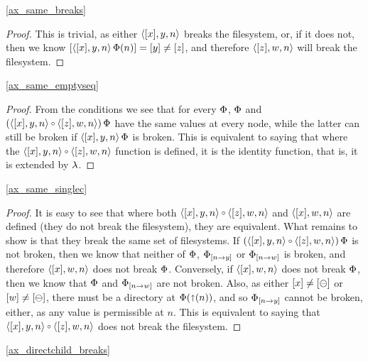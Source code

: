 \cref{ax_same_breaks}

\begin{proof}
This is trivial, as either $\langle{[x],y,n}\rangle$ breaks the filesystem, or, if it does not, then
we know $[\langle{[x],y,n}\rangle\,\Phi(n)]=[y]\neq [z]$, and therefore $\langle{[z],w,n}\rangle$ will break the filesystem.
\end{proof}

\cref{ax_same_emptyseq}

\begin{proof}
From the conditions we see that for every $\Phi$,
$\Phi$ and $(\cxynv\cc\czwnv)\aFS$ have the same values at every node,
while the latter can still be broken if $\langle{[x],y,n}\rangle\,\Phi$ is broken.
This is equivalent to saying that where the $\cxynv\cc\czwnv$ function is defined,
it is the identity function, that is, it is extended by $\lambda$.
\end{proof}

\cref{ax_same_singlec}

\begin{proof}
It is easy to see that where both $\cxynv\cc \czwnv$ and $\langle{[x],w,n}\rangle$ are defined
(they do not break the filesystem), they are equivalent.
What remains to show is that they break the same set of filesystems.
If $(\cxynv\cc \czwnv)\aFS$ is not broken, then we know that neither of
$\Phi$, ${\Phi}_{[{n}\rightarrow{y}]}$ or ${\Phi}_{[{n}\rightarrow{w}]}$ is broken,
and therefore $\langle{[x],w,n}\rangle$ does not break $\Phi$.
Conversely, if $\langle{[x],w,n}\rangle$ does not break $\Phi$, then 
we know that $\Phi$ and ${\Phi}_{[{n}\rightarrow{w}]}$ are not broken.
Also, as
either $[x]\neq[\ominus]$ or $[w]\neq[\ominus]$,
there must be a directory at $\Phi(\mathord{\shortuparrow}({n}))$,
and so ${\Phi}_{[{n}\rightarrow{y}]}$ cannot be broken, either,
as any value is permissible at $n$.
This is equivalent to saying that $\cxynv\cc \czwnv$ does not break the filesystem.
\end{proof}

\cref{ax_directchild_breaks}

